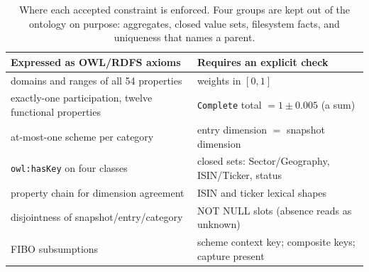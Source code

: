 \begin{table}[t]
\centering
\footnotesize
\caption{Where each accepted constraint is enforced. Four groups are kept out of
the ontology on purpose: aggregates, closed value sets, filesystem facts, and
uniqueness that names a parent.}
\label{tab:split}
\begin{tabular}{@{}>{\raggedright\arraybackslash}p{}>{\raggedright\arraybackslash}p{}@{}}
\toprule
Expressed as OWL/RDFS axioms & Requires an explicit check \\
\midrule
domains and ranges of all 54 properties & weights in $[0,1]$ \\
exactly-one participation, twelve functional properties & \texttt{Complete} total $=1\pm0.005$ (a sum) \\
at-most-one scheme per category & entry dimension $=$ snapshot dimension \\
\texttt{owl:hasKey} on four classes & closed sets: Sector/Geography, ISIN/Ticker, status \\
property chain for dimension agreement & ISIN and ticker lexical shapes \\
disjointness of snapshot/entry/category & NOT NULL slots (absence reads as unknown) \\
FIBO subsumptions & scheme context key; composite keys; capture present \\
\bottomrule
\end{tabular}
\end{table}

